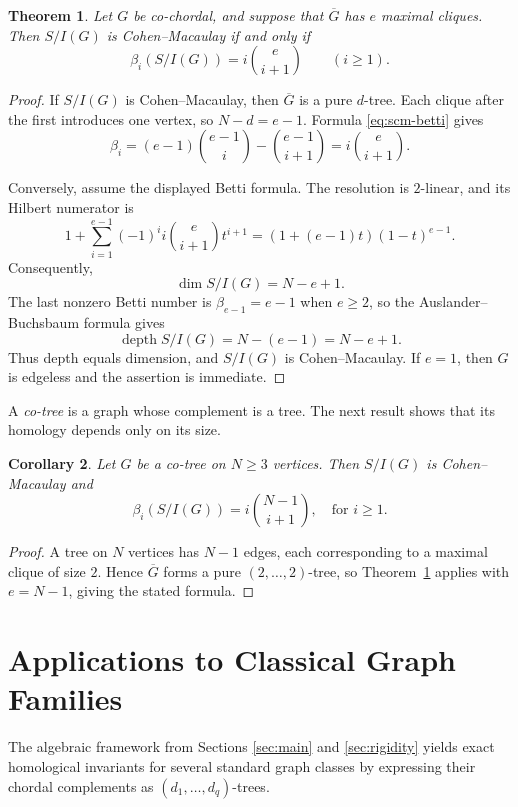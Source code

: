 \documentclass[12pt, reqno]{amsart}
\newtheorem{theorem}{Theorem}[section]
\newtheorem{corollary}[theorem]{Corollary}
\theoremstyle{definition}
\numberwithin{equation}{section}
\begin{document}
	\begin{theorem}\label{thm:cm_betti_iff}
Let $G$ be co-chordal, and suppose that $\overline G$ has $e$ maximal cliques.  Then $S/I(G)$ is Cohen--Macaulay if and only if
\[
\beta_i(S/I(G))=i\binom{e}{i+1}
\qquad(i\ge1).
\]
\end{theorem}
\begin{proof}
If $S/I(G)$ is Cohen--Macaulay, then $\overline G$ is a pure $d$-tree.  Each clique after the first introduces one vertex, so $N-d=e-1$.  Formula \eqref{eq:scm-betti} gives
\[
\beta_i=(e-1)\binom{e-1}{i}-\binom{e-1}{i+1}
=i\binom{e}{i+1}.
\]

Conversely, assume the displayed Betti formula.  The resolution is $2$-linear, and its Hilbert numerator is
\[
1+\sum_{i=1}^{e-1}(-1)^i i\binom{e}{i+1}t^{i+1}
=(1+(e-1)t)(1-t)^{e-1}.
\]
Consequently,
\[
\dim S/I(G)=N-e+1.
\]
The last nonzero Betti number is $\beta_{e-1}=e-1$ when $e\ge2$, so the Auslander--Buchsbaum formula gives
\[
\operatorname{depth}S/I(G)=N-(e-1)=N-e+1.
\]
Thus depth equals dimension, and $S/I(G)$ is Cohen--Macaulay.  If $e=1$, then $G$ is edgeless and the assertion is immediate.
\end{proof}
	
	A \emph{co-tree} is a graph whose complement is a tree. The next result shows that its homology depends only on its size.
	
	\begin{corollary}
		Let $G$ be a co-tree on $N\ge 3$ vertices. Then $S/I(G)$ is Cohen--Macaulay and
		\[
		\beta_i(S/I(G)) = i\binom{N-1}{i+1}, \quad \text{for } i \ge1.
		\]
	\end{corollary}
	\begin{proof}
		A tree on $N$ vertices has $N-1$ edges, each corresponding to a maximal clique of size $2$. Hence $\overline{G}$ forms a pure $(2,\dots,2)$-tree, so Theorem~\ref{thm:cm_betti_iff} applies with $e=N-1$, giving the stated formula.
	\end{proof}
	
	\section{Applications to Classical Graph Families} \label{sec:applications}
	
	The algebraic framework from Sections \ref{sec:main} and \ref{sec:rigidity} yields exact homological invariants for several standard graph classes by expressing their chordal complements as $(d_1,\dots,d_q)$-trees.
	
\end{document}
